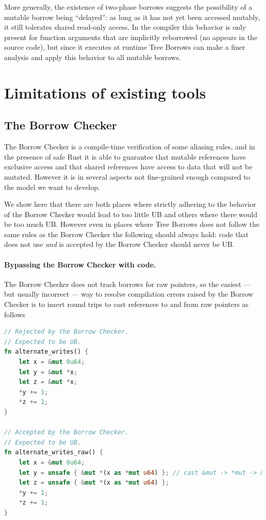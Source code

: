 \documentclass[a4paper,11pt]{article}
\theoremstyle{plain}
\theoremstyle{definition}
\theoremstyle{remark}
\newcommand{\tcode}[1]{\rstinline{#1}}
\begin{document}
More generally, the existence of two-phase borrows suggests the possibility of a mutable
borrow being ``delayed'': as long as it has not yet been accessed mutably, it still
tolerates shared read-only access.
In the compiler this behavior is only present for function arguments that are
implicitly reborrowed (no \tcode{\&mut} appears in the source code), but since it
executes at runtime Tree Borrows can make a finer analysis and apply this behavior
to all mutable borrows.


\section{Limitations of existing tools}

\subsection{The Borrow Checker}

The Borrow Checker is a compile-time verification of some aliasing rules, and
in the presence of safe Rust it is able to guarantee that mutable references
have exclusive access and that shared references have access to data that will
not be mutated. However it is in several aspects not fine-grained enough compared
to the model we want to develop.

We show here that there are both places where strictly adhering to the behavior
of the Borrow Checker would lead to too little UB and others where there would
be too much UB.
However even in places where Tree Borrows does not follow the same rules as the
Borrow Checker the following should always hold: code that does not use
\tcode{unsafe} \textit{and} is accepted by the Borrow Checker should never
be UB.

\paragraph*{Bypassing the Borrow Checker with \tcode{unsafe} code.}
The Borrow Checker does not track borrows for raw pointers, so the easiest
--- but usually incorrect --- way to resolve compilation errors raised by the
Borrow Checker is to insert round trips to cast references to and from raw
pointers as follows
\begin{lstlisting}[language=rust]
// Rejected by the Borrow Checker.
// Expected to be UB.
fn alternate_writes() {
    let x = &mut 0u64;
    let y = &mut *x;
    let z = &mut *x;
    *y += 1;
    *z += 1;
}

// Accepted by the Borrow Checker.
// Expected to be UB.
fn alternate_writes_raw() {
    let x = &mut 0u64;
    let y = unsafe { &mut *(x as *mut u64) }; // cast &mut -> *mut -> &mut
    let z = unsafe { &mut *(x as *mut u64) };
    *y += 1;
    *z += 1;
}
\end{lstlisting}
\end{document}
